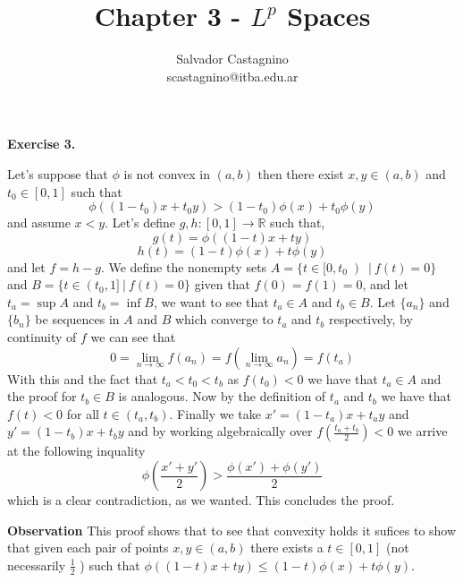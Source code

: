 \documentclass{article}
\author{Salvador Castagnino \\ scastagnino@itba.edu.ar}
\date{}
\title{Chapter 3 - $L^p$ Spaces}
\begin{document}
\maketitle

\begin{exercise}\textbf{Exercise 3.}

    Let's suppose that $\phi$ is not convex in $ \left( a,b \right)   $ then there exist $x,y \in \left( a,b \right) $ and $t_0 \in [0,1]$ such that
    \[
       \phi \left( \left( 1-t_0 \right) x + t_0 y \right) > \left( 1-t_0 \right) \phi \left( x \right) + t_0 \phi \left( y \right)  
    \]
    and assume $x < y$. Let's define $g,h:[0,1] \rightarrow \mathbb{R}$ such that,
    \[
       g \left( t \right) = \phi \left( \left( 1-t \right) x + t y \right)
    \]
    \[
       h \left( t \right) = \left( 1-t \right) \phi \left( x \right) + t \phi \left( y \right)  
        
    \]
    and let $f = h - g$. We define the nonempty sets $A = \{t \in [0,t_0\left)\ |\ f(t)=0\}$ and $B = \{t \in \left(t_0, 1]\ |\ f(t)=0\}$ given that $f \left( 0 \right) = f \left( 1 \right) = 0$, and let $t_a = \sup A$ and $t_b = \inf B$, we want to see that $t_a \in A$  and $t_b \in B$. Let $\{a_n\}$ and $\{b_n\}$ be sequences in $A$ and $B$ which converge to $t_a$ and $t_b$ respectively, by continuity of $f$ we can see that
    \[
        0 = \lim_{n \to \infty} f \left( a_n \right) = f \left( \lim_{n \to \infty} a_n \right) = f \left( t_a \right) 
    \]
    With this and the fact that $t_a < t_0 < t_b$ as $f \left( t_0 \right) < 0$ we have that $t_a \in A$ and the proof for $t_b \in B$ is analogous. Now by the definition of $t_a$ and $t_b$ we have that $f \left( t \right) < 0$ for all $t \in \left( t_a,t_b \right)$. Finally we take $x'= \left( 1-t_a \right) x+t_ay$ and $y' = \left( 1-t_b \right) x+t_by$ and by working algebraically over $f \left( \frac{t_a+t_b}{2} \right) < 0$ we arrive at the following inquality
    \[
        \phi \left( \frac{x'+y'}{2} \right) > \frac{\phi \left( x' \right) + \phi \left( y' \right) }{2}
    \]
    which is a clear contradiction, as we wanted. This concludes the proof.

    
\end{exercise}

\bigbreak

\begin{observation}\textbf{Observation}
    This proof shows that to see that convexity holds it sufices to show that given each pair of points $x,y \in \left( a,b \right) $ there exists a $t \in [0,1]$ (not necessarily $\frac{1}{2}$ ) such that $\phi \left( \left( 1-t \right) x + t y \right) \le  \left( 1-t \right) \phi \left( x \right) + t \phi \left( y \right)$. 
\end{observation}
\end{document}
